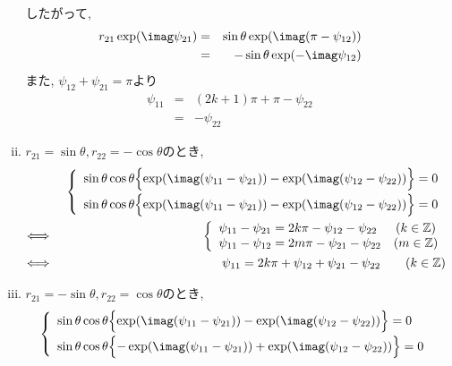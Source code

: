 \documentclass[dvipdfmx,titlepage, 11pt, a4paper]{jsarticle}%
\begin{document}
\begin{enumerate}[(1)]
\begin{enumerate}[(i)]
      したがって,
      \begin{eqnarray*}
        r_{21}\exp(\imag \psi_{21}) &=& \sin\theta \exp(\imag (\pi-\psi_{12}))\\
                        &=& -\sin\theta\exp(-\imag\psi_{12})
      \end{eqnarray*}
      また, $\psi_{12}+\psi_{21}=\pi$より
      \begin{eqnarray*}
        \psi_{11}&=&(2k+1)\pi+\pi-\psi_{22}\\
                 &=&-\psi_{22}
      \end{eqnarray*}
    \item $r_{21}=\sin\theta,r_{22}=-\cos\theta$のとき,
      \begin{eqnarray*}
        &&\left\{
        \begin{array}{l}
          \sin\theta\cos\theta\Bigl\{\exp(\imag(\psi_{11}-\psi_{21}))-\exp(\imag(\psi_{12}-\psi_{22}))\Bigr\}=0\\[0.2cm]
          \sin\theta\cos\theta\Bigl\{\exp(\imag(\psi_{11}-\psi_{21}))-\exp(\imag(\psi_{12}-\psi_{22}))\Bigr\}=0
        \end{array}
        \right.\\
        \Longleftrightarrow\ &&\left\{
                                \begin{array}{lc}
                                  \psi_{11}-\psi_{21}=2k\pi -\psi_{12}-\psi_{22}&(k\in\mathbb{Z})\\
                                  \psi_{11}-\psi_{12}=2m\pi-\psi_{21}-\psi_{22}&(m\in\mathbb{Z})\\
                                \end{array}
        \right.\\
        \Longleftrightarrow\ && \psi_{11}=2k\pi+\psi_{12}+\psi_{21}-\psi_{22}\hspace{20pt} (k\in\mathbb{Z})
      \end{eqnarray*}
    \item $r_{21}=-\sin\theta,r_{22}=\cos\theta$のとき,
      \begin{eqnarray*}
        &&\left\{
        \begin{array}{l}
          \sin\theta\cos\theta\Bigl\{\exp(\imag(\psi_{11}-\psi_{21}))-\exp(\imag(\psi_{12}-\psi_{22}))\Bigr\}=0\\[0.2cm]
          \sin\theta\cos\theta\Bigl\{-\exp(\imag(\psi_{11}-\psi_{21}))+\exp(\imag(\psi_{12}-\psi_{22}))\Bigr\}=0
        \end{array}
        \right.\\

\end{eqnarray*}
\end{enumerate}
\end{enumerate}
\end{document}
